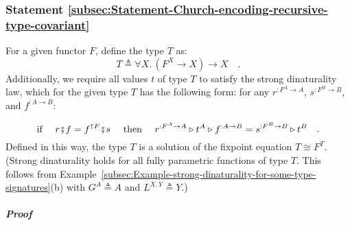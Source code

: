 \subsubsection{Statement \label{subsec:Statement-Church-encoding-recursive-type-covariant}\ref{subsec:Statement-Church-encoding-recursive-type-covariant}}

For a given functor $F$, define the type $T$ as:
\[
T\triangleq\forall X.\,(F^{X}\rightarrow X)\rightarrow X\quad.
\]
Additionally, we require all values $t$ of type $T$ to satisfy the
strong dinaturality law,
which for the given type $T$ has the following form: for any $r^{:F^{A}\rightarrow A}$,
$s^{:F^{B}\rightarrow B}$, and $f^{:A\rightarrow B}$: 

\begin{equation}
\text{if }\quad r\bef f=f^{\uparrow F}\bef s\quad\text{ then }\quad r^{:F^{A}\rightarrow A}\triangleright t^{A}\triangleright f^{:A\rightarrow B}=s^{:F^{B}\rightarrow B}\triangleright t^{B}\quad.\label{eq:strong-dinaturality-for-church-encoded-fix-unfix}
\end{equation}
Defined in this way, the type $T$ is a solution of the fixpoint equation
$T\cong F^{T}$. (Strong dinaturality holds for all fully parametric
functions of type $T$. This follows from Example~\ref{subsec:Example-strong-dinaturality-for-some-type-signatures}(b)
with $G^{A}\triangleq A$ and $L^{X,Y}\triangleq Y$.)

\subparagraph{Proof}


